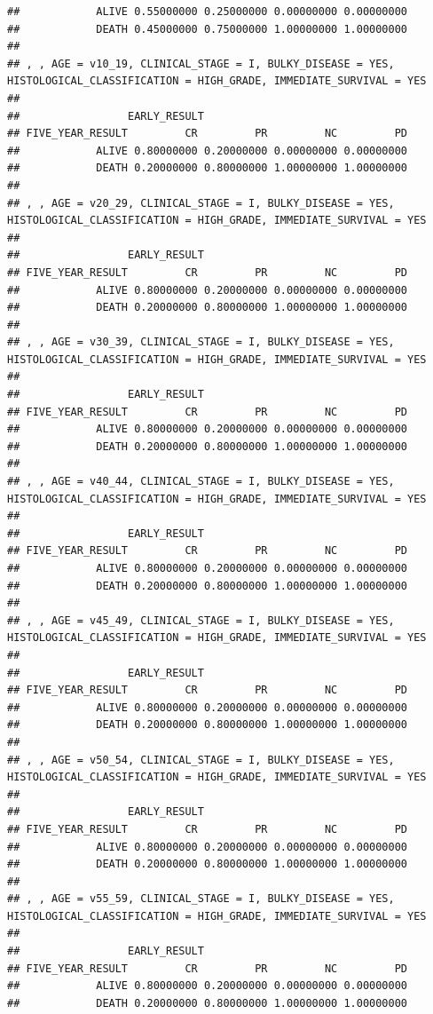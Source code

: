 \documentclass[]{article}
\begin{document}
\begin{verbatim}
##            ALIVE 0.55000000 0.25000000 0.00000000 0.00000000
##            DEATH 0.45000000 0.75000000 1.00000000 1.00000000
## 
## , , AGE = v10_19, CLINICAL_STAGE = I, BULKY_DISEASE = YES, HISTOLOGICAL_CLASSIFICATION = HIGH_GRADE, IMMEDIATE_SURVIVAL = YES
## 
##                 EARLY_RESULT
## FIVE_YEAR_RESULT         CR         PR         NC         PD
##            ALIVE 0.80000000 0.20000000 0.00000000 0.00000000
##            DEATH 0.20000000 0.80000000 1.00000000 1.00000000
## 
## , , AGE = v20_29, CLINICAL_STAGE = I, BULKY_DISEASE = YES, HISTOLOGICAL_CLASSIFICATION = HIGH_GRADE, IMMEDIATE_SURVIVAL = YES
## 
##                 EARLY_RESULT
## FIVE_YEAR_RESULT         CR         PR         NC         PD
##            ALIVE 0.80000000 0.20000000 0.00000000 0.00000000
##            DEATH 0.20000000 0.80000000 1.00000000 1.00000000
## 
## , , AGE = v30_39, CLINICAL_STAGE = I, BULKY_DISEASE = YES, HISTOLOGICAL_CLASSIFICATION = HIGH_GRADE, IMMEDIATE_SURVIVAL = YES
## 
##                 EARLY_RESULT
## FIVE_YEAR_RESULT         CR         PR         NC         PD
##            ALIVE 0.80000000 0.20000000 0.00000000 0.00000000
##            DEATH 0.20000000 0.80000000 1.00000000 1.00000000
## 
## , , AGE = v40_44, CLINICAL_STAGE = I, BULKY_DISEASE = YES, HISTOLOGICAL_CLASSIFICATION = HIGH_GRADE, IMMEDIATE_SURVIVAL = YES
## 
##                 EARLY_RESULT
## FIVE_YEAR_RESULT         CR         PR         NC         PD
##            ALIVE 0.80000000 0.20000000 0.00000000 0.00000000
##            DEATH 0.20000000 0.80000000 1.00000000 1.00000000
## 
## , , AGE = v45_49, CLINICAL_STAGE = I, BULKY_DISEASE = YES, HISTOLOGICAL_CLASSIFICATION = HIGH_GRADE, IMMEDIATE_SURVIVAL = YES
## 
##                 EARLY_RESULT
## FIVE_YEAR_RESULT         CR         PR         NC         PD
##            ALIVE 0.80000000 0.20000000 0.00000000 0.00000000
##            DEATH 0.20000000 0.80000000 1.00000000 1.00000000
## 
## , , AGE = v50_54, CLINICAL_STAGE = I, BULKY_DISEASE = YES, HISTOLOGICAL_CLASSIFICATION = HIGH_GRADE, IMMEDIATE_SURVIVAL = YES
## 
##                 EARLY_RESULT
## FIVE_YEAR_RESULT         CR         PR         NC         PD
##            ALIVE 0.80000000 0.20000000 0.00000000 0.00000000
##            DEATH 0.20000000 0.80000000 1.00000000 1.00000000
## 
## , , AGE = v55_59, CLINICAL_STAGE = I, BULKY_DISEASE = YES, HISTOLOGICAL_CLASSIFICATION = HIGH_GRADE, IMMEDIATE_SURVIVAL = YES
## 
##                 EARLY_RESULT
## FIVE_YEAR_RESULT         CR         PR         NC         PD
##            ALIVE 0.80000000 0.20000000 0.00000000 0.00000000
##            DEATH 0.20000000 0.80000000 1.00000000 1.00000000

\end{verbatim}
\end{document}
